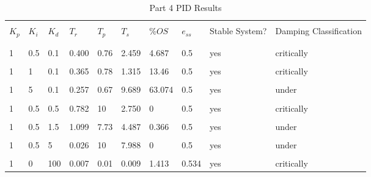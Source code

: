 \begin{table}[H]
	\begin{tabularx}{\textwidth}{XXXXXXXXXX}
		\toprule
		\\ $K_p$ & $K_i$ & $K_d$ & $T_r$ & $T_p$ & $T_s$ & $\%OS$ & $e_{ss}$ 
		& Stable System? & Damping Classification
		\\ \midrule
		
\\\midrule\\1&0.5&0.1&0.400&0.76&2.459&4.687&0.5&yes&critically 
\\\midrule\\1&1&0.1&0.365&0.78&1.315&13.46&0.5&yes&critically 
\\\midrule\\1&5&0.1&0.257&0.67&9.689&63.074&0.5&yes&under 
\\\midrule\\1&0.5&0.5&0.782&10&2.750&0&0.5&yes&critically 
\\\midrule\\1&0.5&1.5&1.099&7.73&4.487&0.366&0.5&yes&under 
\\\midrule\\1&0.5&5&0.026&10&7.988&0&0.5&yes&under 
\\\midrule\\1&0&100&0.007&0.01&0.009&1.413&0.534&yes&critically 
		\\ \bottomrule
	\end{tabularx}
	\caption{Part 4 PID Results}
	\label{tab:pid4SimResults}
\end{table}
